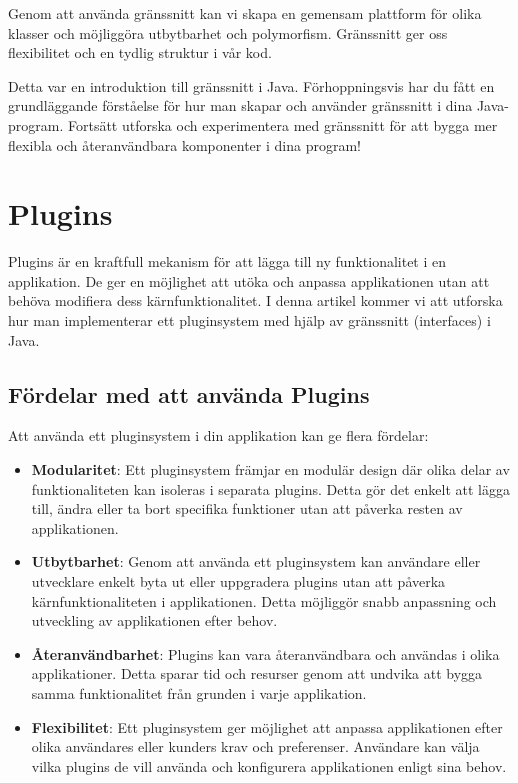 Genom att använda gränssnitt kan vi skapa en gemensam plattform för
olika klasser och möjliggöra utbytbarhet och polymorfism. Gränssnitt ger
oss flexibilitet och en tydlig struktur i vår kod.

Detta var en introduktion till gränssnitt i Java. Förhoppningsvis har du
fått en grundläggande förståelse för hur man skapar och använder
gränssnitt i dina Java-program. Fortsätt utforska och experimentera med
gränssnitt för att bygga mer flexibla och återanvändbara komponenter i
dina program!

\hypertarget{plugins}{%
\section{Plugins}\label{plugins}}

Plugins är en kraftfull mekanism för att lägga till ny funktionalitet i
en applikation. De ger en möjlighet att utöka och anpassa applikationen
utan att behöva modifiera dess kärnfunktionalitet. I denna artikel
kommer vi att utforska hur man implementerar ett pluginsystem med hjälp
av gränssnitt (interfaces) i Java.

\hypertarget{fuxf6rdelar-med-att-anvuxe4nda-plugins}{%
\subsection{Fördelar med att använda
Plugins}\label{fuxf6rdelar-med-att-anvuxe4nda-plugins}}

Att använda ett pluginsystem i din applikation kan ge flera fördelar:

\begin{itemize}
\item
  \textbf{Modularitet}: Ett pluginsystem främjar en modulär design där
  olika delar av funktionaliteten kan isoleras i separata plugins. Detta
  gör det enkelt att lägga till, ändra eller ta bort specifika
  funktioner utan att påverka resten av applikationen.
\item
  \textbf{Utbytbarhet}: Genom att använda ett pluginsystem kan användare
  eller utvecklare enkelt byta ut eller uppgradera plugins utan att
  påverka kärnfunktionaliteten i applikationen. Detta möjliggör snabb
  anpassning och utveckling av applikationen efter behov.
\item
  \textbf{Återanvändbarhet}: Plugins kan vara återanvändbara och
  användas i olika applikationer. Detta sparar tid och resurser genom
  att undvika att bygga samma funktionalitet från grunden i varje
  applikation.
\item
  \textbf{Flexibilitet}: Ett pluginsystem ger möjlighet att anpassa
  applikationen efter olika användares eller kunders krav och
  preferenser. Användare kan välja vilka plugins de vill använda och
  konfigurera applikationen enligt sina behov.
\end{itemize}

